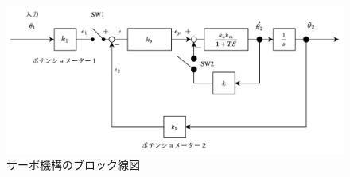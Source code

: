 \begin{figure}
    \centering
    \includegraphics[width=0.8\linewidth]{src/figures/servo-block-line-detail/servo-block-line-detail.png}
    \caption{サーボ機構のブロック線図}\label{fig:servo-block-line-detail}
\end{figure}
